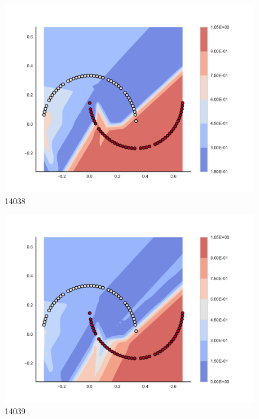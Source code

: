 \begin{subfigure}[b]{0.09\textwidth}
    \includegraphics[clip, trim=2.35cm 1.75cm 4.5cm 0cm,width=\textwidth]{img/convergence/14038.pdf}
    \caption{14038}
    \label{fig:convergence_14038}
\end{subfigure}
%
\begin{subfigure}[b]{0.09\textwidth}
    \includegraphics[clip, trim=2.35cm 1.75cm 4.5cm 0cm,width=\textwidth]{img/convergence/14039.pdf}
    \caption{14039}
    \label{fig:convergence_14039}
\end{subfigure}
%
